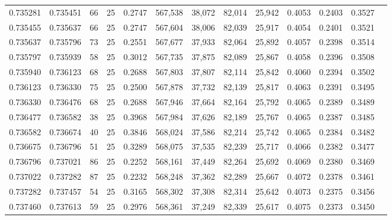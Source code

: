 \begin{tabular}{rrrrrrrrrrrrr}
0.735281 & 0.735451 &    66 &  25 &                                     0.2747 & 567,538 &  38,072 &  82,014 &  25,942 & 0.4053 & 0.2403 & 0.3527 \\
0.735455 & 0.735637 &    66 &  25 &                                     0.2747 & 567,604 &  38,006 &  82,039 &  25,917 & 0.4054 & 0.2401 & 0.3521 \\
0.735637 & 0.735796 &    73 &  25 &                                     0.2551 & 567,677 &  37,933 &  82,064 &  25,892 & 0.4057 & 0.2398 & 0.3514 \\
0.735797 & 0.735939 &    58 &  25 &                                     0.3012 & 567,735 &  37,875 &  82,089 &  25,867 & 0.4058 & 0.2396 & 0.3508 \\
0.735940 & 0.736123 &    68 &  25 &                                     0.2688 & 567,803 &  37,807 &  82,114 &  25,842 & 0.4060 & 0.2394 & 0.3502 \\
0.736123 & 0.736330 &    75 &  25 &                                     0.2500 & 567,878 &  37,732 &  82,139 &  25,817 & 0.4063 & 0.2391 & 0.3495 \\
0.736330 & 0.736476 &    68 &  25 &                                     0.2688 & 567,946 &  37,664 &  82,164 &  25,792 & 0.4065 & 0.2389 & 0.3489 \\
0.736477 & 0.736582 &    38 &  25 &                                     0.3968 & 567,984 &  37,626 &  82,189 &  25,767 & 0.4065 & 0.2387 & 0.3485 \\
0.736582 & 0.736674 &    40 &  25 &                                     0.3846 & 568,024 &  37,586 &  82,214 &  25,742 & 0.4065 & 0.2384 & 0.3482 \\
0.736675 & 0.736796 &    51 &  25 &                                     0.3289 & 568,075 &  37,535 &  82,239 &  25,717 & 0.4066 & 0.2382 & 0.3477 \\
0.736796 & 0.737021 &    86 &  25 &                                     0.2252 & 568,161 &  37,449 &  82,264 &  25,692 & 0.4069 & 0.2380 & 0.3469 \\
0.737022 & 0.737282 &    87 &  25 &                                     0.2232 & 568,248 &  37,362 &  82,289 &  25,667 & 0.4072 & 0.2378 & 0.3461 \\
0.737282 & 0.737457 &    54 &  25 &                                     0.3165 & 568,302 &  37,308 &  82,314 &  25,642 & 0.4073 & 0.2375 & 0.3456 \\
0.737460 & 0.737613 &    59 &  25 &                                     0.2976 & 568,361 &  37,249 &  82,339 &  25,617 & 0.4075 & 0.2373 & 0.3450 \\

\end{tabular}
